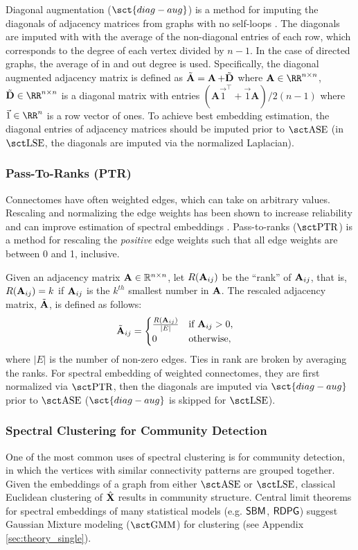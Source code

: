Diagonal augmentation ($\sct{diag-aug}$) is a method for imputing the diagonals of adjacency matrices from graphs with no self-loops \cite{marchette2011vertex,tang2018connectome,scheinerman2010modeling}. The diagonals are imputed with with the average of the non-diagonal entries of each row, which corresponds to the degree of each vertex divided by $n-1$. In the case of directed graphs, the average of in and out degree is used. Specifically, the diagonal augmented adjacency matrix is defined as $\tilde {\operatorname{\mathbf{A}}} = \operatorname{\mathbf{A}} + \tilde{\operatorname{\mathbf{D}}}$ where $\A\in\RR^{n\times n}$, $\tilde \D \in\RR^{n\times n}$ is a diagonal matrix with entries $(\mathbf{A}\vec 1^\top + \vec 1\mathbf{A}) /2(n-1)$ where $\vec 1 \in\RR^n$ is a row vector of ones. To achieve best embedding estimation, the diagonal entries of adjacency matrices should be imputed prior to $\ase$ (in $\lse$, the diagonals are imputed via the normalized Laplacian).

\subsubsection{Pass-To-Ranks (PTR)}
Connectomes have often weighted edges, which can take on arbitrary values. Rescaling and normalizing the edge weights has been shown to increase reliability and can improve estimation of spectral embeddings \cite{Kiar188706}. Pass-to-ranks ($\ptr$) is a method for rescaling the \textit{positive} edge weights such that all edge weights are between 0 and 1, inclusive. 

Given an adjacency matrix $\operatorname{\mathbf{A}} \in \mathbb{R}^{n\times n}$, let $R(\operatorname{\mathbf{A}}_{ij})$ be the ``rank'' of $\operatorname{\mathbf{A}}_{ij}$, that is, $R(\operatorname{\mathbf{A}}_{ij}) = k$ if $\operatorname{\mathbf{A}}_{ij}$ is the $k^{th}$ smallest number in $\operatorname{\mathbf{A}}$. The rescaled adjacency matrix, $\Tilde{\operatorname{\mathbf{A}}}$, is defined as follows:
\begin{align*}
    \Tilde{\operatorname{\mathbf{A}}}_{ij} &= \begin{cases}
    \frac{R(\operatorname{\mathbf{A}}_{ij})}{|E|} & \text{if $\operatorname{\mathbf{A}}_{ij} > 0$},\\
    0 & \text{otherwise},
    \end{cases}
\end{align*}
where $|E|$ is the number of non-zero edges. Ties in rank are broken by averaging the ranks. For spectral embedding of weighted connectomes, they are first normalized via $\ptr$, then the diagonals are imputed via $\sct{diag-aug}$ prior to $\ase$ ($\sct{diag-aug}$ is skipped for $\lse$). 

\subsubsection{Spectral Clustering for Community Detection} \label{sec:clustering_single}
One of the most common uses of spectral clustering is for community detection, in which the vertices with similar connectivity patterns are grouped together. Given the embeddings of a graph from either $\ase$ or $\lse$, classical Euclidean clustering of $\hat{\operatorname{\mathbf{X}}}$ results in community structure. Central limit theorems for spectral embeddings of many statistical models (e.g. $\operatorname{\mathsf{SBM}}$, $\operatorname{\mathsf{RDPG}}$) suggest Gaussian Mixture modeling ($\gmm$) for clustering (see Appendix \ref{sec:theory_single}).


